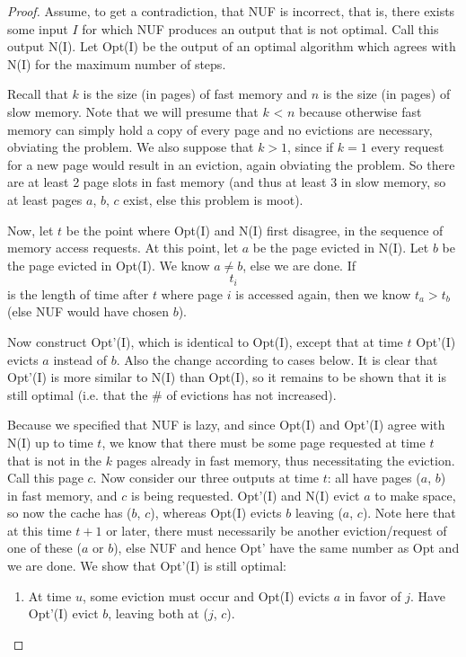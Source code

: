 \documentclass{article}
\begin{document}
	\begin{proof}
		Assume, to get a contradiction, that NUF is incorrect, that is, there exists some input $I$ for which NUF produces an output that is not optimal. Call this output N(I).
		Let Opt(I) be the output of an optimal algorithm which agrees with N(I) for the maximum number of steps.
		
		Recall that $k$ is the size (in pages) of fast memory and $n$ is the size (in pages) of slow memory.
		Note that we will presume that $k$ < $n$ because otherwise fast memory can simply hold a copy of every page and no evictions are necessary, obviating the problem. We also suppose that $k > 1$, since if $k = 1$ every request for a new page would result in an eviction, again obviating the problem. So there are at least 2 page slots in fast memory (and thus at least 3 in slow memory, so at least pages $a$, $b$, $c$ exist, else this problem is moot).
		
		Now, let $t$ be the point where Opt(I) and N(I) first disagree, in the sequence of memory access requests. At this point, let $a$ be the page evicted in N(I).  
		Let $b$ be the page evicted in Opt(I). We know $a \ne b$, else we are done.
		If $$t_i$$ is the length of time after $t$ where page $i$ is accessed again, then we know $t_a > t_b$ (else NUF would have chosen $b$).
		
		Now construct Opt'(I), which is identical to Opt(I), except that at time $t$ Opt'(I) evicts $a$ instead of $b$. Also the change according to cases below.
		It is clear that Opt'(I) is more similar to N(I) than Opt(I), so it remains to be shown that it is still optimal (i.e. that the \# of evictions has not increased).
		
		Because we specified that NUF is lazy, and since Opt(I) and Opt'(I) agree with N(I) up to time $t$, we know that there must be some page requested at time $t$ that is not in the $k$ pages already in fast memory, thus necessitating the eviction. Call this page $c$. Now consider our three outputs at time $t$: all have pages ($a$, $b$) in fast memory, and $c$ is being requested. Opt'(I) and N(I) evict $a$ to make space, so now the cache has ($b$, $c$), whereas Opt(I) evicts $b$ leaving ($a$, $c$). Note here that at this time $t+1$ or later, there must necessarily be another eviction/request of one of these ($a$ or $b$), else NUF and hence Opt' have the same number as Opt and we are done. We show that Opt'(I) is still optimal:
		
		\begin{enumerate}[label=\textbf{Case \arabic*.}]
			\item At time $u$, some eviction must occur and Opt(I) evicts $a$ in favor of $j$. Have Opt'(I) evict $b$, leaving both at ($j$, $c$).
			

\end{enumerate}
\end{proof}
\end{document}

